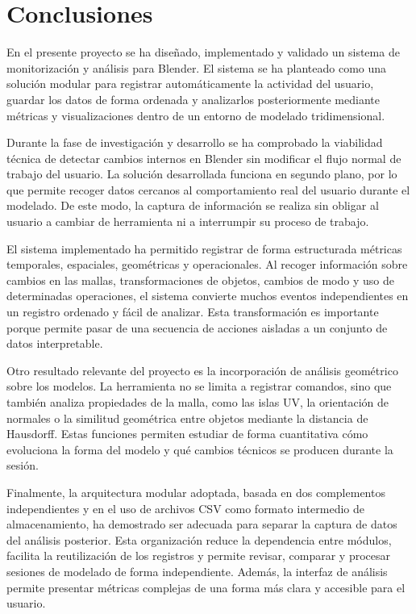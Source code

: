 
\section{Conclusiones}

En el presente proyecto se ha diseñado, implementado y validado un sistema de monitorización y análisis para Blender. El sistema se ha planteado como una solución modular para registrar automáticamente la actividad del usuario, guardar los datos de forma ordenada y analizarlos posteriormente mediante métricas y visualizaciones dentro de un entorno de modelado tridimensional.

Durante la fase de investigación y desarrollo se ha comprobado la viabilidad técnica de detectar cambios internos en Blender sin modificar el flujo normal de trabajo del usuario. La solución desarrollada funciona en segundo plano, por lo que permite recoger datos cercanos al comportamiento real del usuario durante el modelado. De este modo, la captura de información se realiza sin obligar al usuario a cambiar de herramienta ni a interrumpir su proceso de trabajo.

El sistema implementado ha permitido registrar de forma estructurada métricas temporales, espaciales, geométricas y operacionales. Al recoger información sobre cambios en las mallas, transformaciones de objetos, cambios de modo y uso de determinadas operaciones, el sistema convierte muchos eventos independientes en un registro ordenado y fácil de analizar. Esta transformación es importante porque permite pasar de una secuencia de acciones aisladas a un conjunto de datos interpretable.

Otro resultado relevante del proyecto es la incorporación de análisis geométrico sobre los modelos. La herramienta no se limita a registrar comandos, sino que también analiza propiedades de la malla, como las islas UV, la orientación de normales o la similitud geométrica entre objetos mediante la distancia de Hausdorff. Estas funciones permiten estudiar de forma cuantitativa cómo evoluciona la forma del modelo y qué cambios técnicos se producen durante la sesión.

Finalmente, la arquitectura modular adoptada, basada en dos complementos independientes y en el uso de archivos CSV como formato intermedio de almacenamiento, ha demostrado ser adecuada para separar la captura de datos del análisis posterior. Esta organización reduce la dependencia entre módulos, facilita la reutilización de los registros y permite revisar, comparar y procesar sesiones de modelado de forma independiente. Además, la interfaz de análisis permite presentar métricas complejas de una forma más clara y accesible para el usuario.

